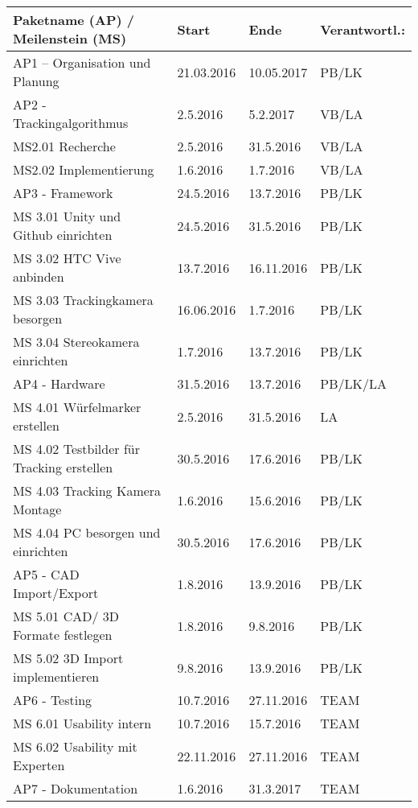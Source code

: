 \begin{table}
	\centering
	\begin{tabular}{|l|l|l|l|}
		\hline
		\Absatzbox{}
		\textbf{Paketname (AP) / Meilenstein (MS)}& \textbf{Start} &  \textbf{Ende} &  \textbf{Verantwortl.:} \\
		\hline
		AP1 – Organisation und Planung & 21.03.2016 & 10.05.2017 & PB/LK\\		
  		\hline
		AP2 - Trackingalgorithmus & 2.5.2016 & 5.2.2017 & VB/LA\\
		\hline
		MS2.01 Recherche  & 2.5.2016 & 31.5.2016 & VB/LA\\
 	 	\hline
		MS2.02 Implementierung  & 1.6.2016 & 1.7.2016 & VB/LA\\
		\hline
		AP3 - Framework  & 24.5.2016 & 13.7.2016 & PB/LK\\
		\hline
		MS 3.01 Unity und Github einrichten  & 24.5.2016 & 31.5.2016 & PB/LK\\
		\hline
		MS 3.02 HTC Vive anbinden & 13.7.2016 & 16.11.2016 & PB/LK\\
		\hline
		MS 3.03 Trackingkamera besorgen &16.06.2016 & 1.7.2016 & PB/LK\\
		\hline
		MS  3.04 Stereokamera einrichten &1.7.2016 & 13.7.2016 & PB/LK\\
		\hline
		AP4 - Hardware & 31.5.2016 & 13.7.2016 & PB/LK/LA\\
		\hline
		MS 4.01 Würfelmarker erstellen & 2.5.2016 & 31.5.2016 & LA\\
		\hline
		MS 4.02 Testbilder für Tracking erstellen  & 30.5.2016 & 17.6.2016 & PB/LK\\
		\hline
		MS 4.03 Tracking Kamera Montage	& 1.6.2016 & 15.6.2016 & PB/LK\\
		\hline
		MS 4.04 PC besorgen und einrichten & 30.5.2016 & 17.6.2016 & PB/LK\\
		\hline
		AP5 - CAD Import/Export & 1.8.2016 & 13.9.2016 & PB/LK\\
		\hline
		MS 5.01 CAD/ 3D Formate festlegen & 1.8.2016 & 9.8.2016 & PB/LK\\
		\hline
		MS 5.02 3D Import implementieren & 9.8.2016 & 13.9.2016 & PB/LK\\
		\hline
		AP6 - Testing & 10.7.2016 & 27.11.2016 & TEAM\\
 		\hline
		MS 6.01 Usability intern & 10.7.2016 & 15.7.2016 & TEAM\\
 		\hline
		MS 6.02 Usability mit Experten &22.11.2016 & 27.11.2016 &TEAM\\
 		\hline
		AP7 - Dokumentation &1.6.2016 & 31.3.2017 & TEAM\\

\end{tabular}
\end{table}
